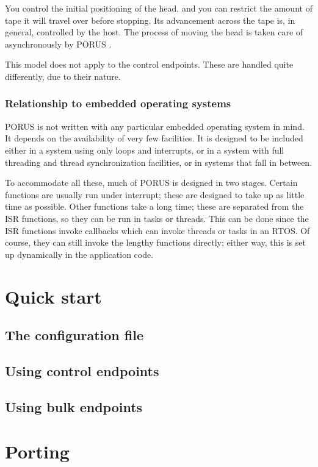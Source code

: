 \documentclass{book}
\newcommand{\porus}{PORUS }
\begin{document}
You control the initial positioning of the head, and you can restrict the amount of tape it will travel over before stopping.  Its advancement across the tape is, in general, controlled by the host.  The process of moving the head is taken care of asynchronously by \porus.

This model does not apply to the control endpoints.  These are handled quite differently, due to their nature.

\subsection{Relationship to embedded operating systems}

\porus is not written with any particular embedded operating system in mind.  It depends on the availability of very few facilities.  It is designed to be included either in a system using only loops and interrupts, or in a system with full threading and thread synchronization facilities, or in systems that fall in between.

To accommodate all these, much of \porus is designed in two stages.  Certain functions are usually run under interrupt; these are designed to take up as little time as possible.  Other functions take a long time; these are separated from the ISR functions, so they can be run in tasks or threads.  This can be done since the ISR functions invoke callbacks which can invoke threads or tasks in an RTOS.  Of course, they can still invoke the lengthy functions directly; either way, this is set up dynamically in the application code.

\chapter{Quick start}

\section{The configuration file}

\section{Using control endpoints}

\section{Using bulk endpoints}

\chapter{Porting}
\end{document}
